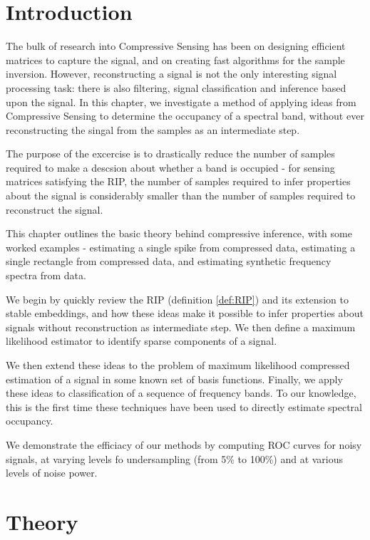 \section{Introduction}

The bulk of research into Compressive Sensing has been on designing efficient matrices to capture the signal, and on creating fast algorithms for the sample inversion. However, reconstructing a signal is not the only interesting signal processing task: there is also filtering, signal classification and inference based upon the signal. In this chapter, we investigate a method of applying ideas from Compressive Sensing to determine the occupancy of a spectral band, without ever reconstructing the singal from the samples as an intermediate step.

The purpose of the excercise is to drastically reduce the number of samples required to make a descsion about whether a band is occupied - for sensing matrices satisfying the RIP, the number of samples required to infer properties about the signal is considerably smaller than the number of samples required to reconstruct the signal. 

This chapter outlines the basic theory behind compressive inference, with some worked examples - estimating a single spike from compressed data, estimating a single rectangle from compressed data, and estimating synthetic frequency spectra from data. 

We begin by quickly review the RIP (definition \eqref{def:RIP}) and its extension to stable embeddings, and how these ideas make it possible to infer properties about signals without reconstruction as intermediate step. We then define a maximum likelihood estimator to identify sparse components of a signal.

We then extend these ideas to the problem of maximum likelihood compressed estimation of a signal in some known set of basis functions. Finally, we apply these ideas to classification of a sequence of frequency bands. To our knowledge, this is the first time these techniques have been used to directly estimate spectral occupancy.

We demonstrate the efficiacy of our methods by computing ROC curves for noisy signals, at varying levels fo undersampling (from 5\% to 100\%) and at various levels of noise power.

\section{Theory}

